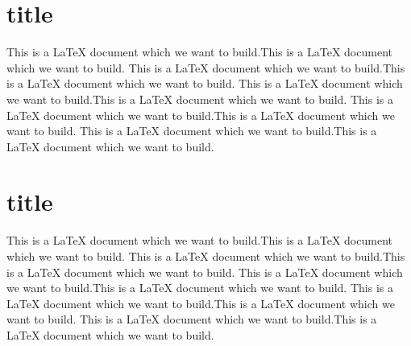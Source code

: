 \documentclass{book}
\begin{document}
    \section{title}
    This is a LaTeX document which we want to build.This is a LaTeX document which we want to build.
    This is a LaTeX document which we want to build.This is a LaTeX document which we want to build.
    This is a LaTeX document which we want to build.This is a LaTeX document which we want to build.
    This is a LaTeX document which we want to build.This is a LaTeX document which we want to build.
    This is a LaTeX document which we want to build.This is a LaTeX document which we want to build.
    \section{title}
    This is a LaTeX document which we want to build.This is a LaTeX document which we want to build.
    This is a LaTeX document which we want to build.This is a LaTeX document which we want to build.
    This is a LaTeX document which we want to build.This is a LaTeX document which we want to build.
    This is a LaTeX document which we want to build.This is a LaTeX document which we want to build.
    This is a LaTeX document which we want to build.This is a LaTeX document which we want to build.
\end{document}
